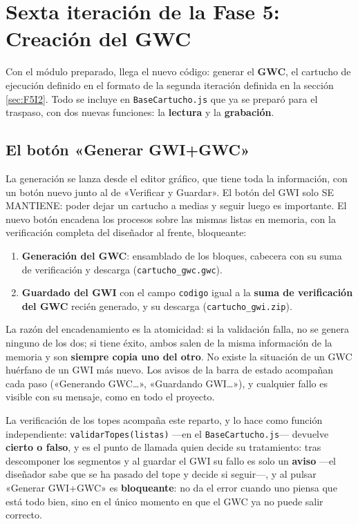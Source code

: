 \section{Sexta iteración de la Fase 5: Creación del GWC}\label{sec:F5I6}

Con el módulo preparado, llega el nuevo código: generar el
\textbf{GWC}, el cartucho de ejecución definido en el formato de la
segunda iteración definida en la sección \ref{sec:F5I2}. Todo se
incluye en \texttt{BaseCartucho.js} que ya se preparó para el
traspaso, con dos nuevas funciones: la \textbf{lectura} y la
\textbf{grabación}.

\subsection{El botón «Generar GWI+GWC»}
\label{sec:F5I6Boton}

La generación se lanza desde el editor gráfico, que tiene toda la
información, con un botón nuevo junto al de «Verificar y Guardar».
El botón del GWI solo SE MANTIENE: poder dejar un cartucho a medias
y seguir luego es importante. El nuevo botón encadena los procesos
sobre las mismas listas en memoria, con la verificación completa del
diseñador al frente, bloqueante:

\begin{enumerate}	
	\item \textbf{Generación del GWC}: ensamblado de los bloques,
	cabecera con su suma de verificación y descarga
	(\texttt{cartucho\_gwc.gwc}).	
	
	\item \textbf{Guardado del GWI} con el campo \texttt{codigo}
	igual a la \textbf{suma de verificación del GWC} recién
	generado, y su descarga (\texttt{cartucho\_gwi.zip}).
\end{enumerate}

La razón del encadenamiento es la atomicidad: si la validación
falla, no se genera ninguno de los dos; si tiene éxito, ambos salen
de la misma información de la memoria y son \textbf{siempre copia
	uno del otro}. No existe la situación de un GWC huérfano de un GWI
más nuevo. Los avisos de la barra de estado acompañan cada paso
(«Generando GWC…», «Guardando GWI…»), y cualquier fallo es visible
con su mensaje, como en todo el proyecto.

La verificación de los topes acompaña este reparto, y lo hace como
función independiente: \texttt{validarTopes(listas)} —en el
\texttt{BaseCartucho.js}— devuelve \textbf{cierto o falso}, y es el
punto de llamada quien decide su tratamiento: tras descomponer los
segmentos y al guardar el GWI su fallo es solo un \textbf{aviso}
—el diseñador sabe que se ha pasado del tope y decide si seguir—, y
al pulsar «Generar GWI+GWC» es \textbf{bloqueante}: no da el error
cuando uno piensa que está todo bien, sino en el único momento en
que el GWC ya no puede salir correcto.

